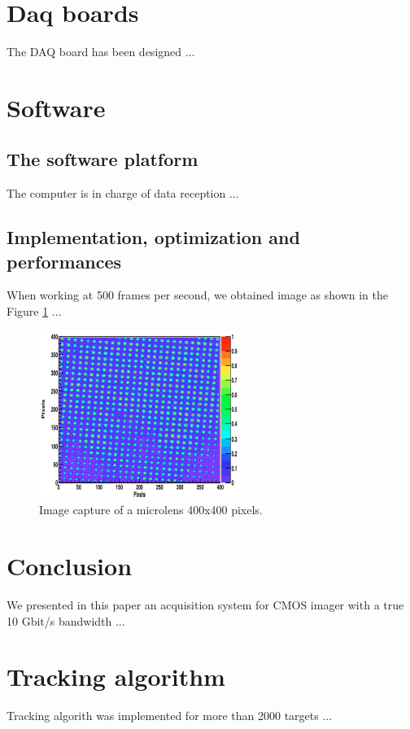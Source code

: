 \documentclass[journal]{IEEEtran}
\begin{document}
\section{Daq boards}
\label{sec:daq}
The DAQ board has been designed ...


\section{Software}
\label{sec:soft}

\subsection{The software platform}
The computer is in charge of data reception ...
\subsection{Implementation, optimization and performances}
When working at 500 frames per second, we obtained image as shown in the Figure \ref{fig:microlens} ...

\begin{figure}[!htb]
\centering
	\includegraphics[width=0.5\linewidth]{microlens.png}
	\caption{Image capture of a microlens 400x400 pixels.}
	\label{fig:microlens}
\end{figure}


\section{Conclusion}
We presented in this paper an acquisition system for CMOS imager with a true 10 Gbit/s bandwidth ...


\appendices
\section{Tracking algorithm}
Tracking algorith was implemented for more than 2000 targets ...
\end{document}
